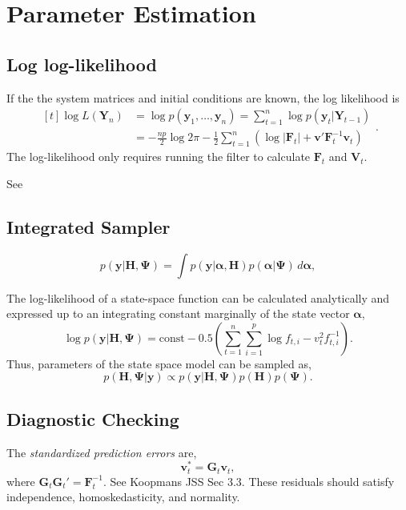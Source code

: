 \documentclass[]{book}
\newcommand{\mat}[1]{\boldsymbol{#1}}
\renewcommand{\vec}[1]{\boldsymbol{#1}}
\renewcommand{\T}{'}
\begin{document}
\chapter{Parameter Estimation}\label{parameter-estimation}

\section{Log log-likelihood}\label{log-log-likelihood}

If the the system matrices and initial conditions are known, the log
likelihood is \[
\begin{aligned}[t]
\log L(\mat{Y}_n) &= \log p(\vec{y}_1, \dots, \vec{y}_n) = \sum_{t = 1}^n \log p(\vec{y}_t | \mat{Y}_{t - 1}) \\
&= - \frac{np}{2} \log 2 \pi - \frac{1}{2} \sum_{t = 1}^n \left( \log \left| \mat{F}_t \right| + \vec{v}\T \mat{F}_t^{-1} \vec{v}_t \right)
\end{aligned} .
\] The log-likelihood only requires running the filter to calculate
\(\mat{F}_t\) and \(\mat{V}_t\).

See \autocite[Sec. 7.2.1]{DurbinKoopman2012}

\section{Integrated Sampler}\label{integrated-sampler}

\[
p(\vec{y} | \mat{H}, \mat{\Psi}) = \int p(\vec{y} | \vec{\alpha}, \mat{H}) p(\vec{\alpha} | \mat{\Psi})\,d\vec{\alpha},
\]

The log-likelihood of a state-space function can be calculated
analytically and expressed up to an integrating constant marginally of
the state vector \(\vec{\alpha}\), \[
\log p(\vec{y} | \mat{H}, \mat{\Psi}) = \text{const} - 0.5 \left( \sum_{t = 1}^n \sum_{i = 1}^p \log f_{t, i} - v_t^2 f^{-1}_{t,i} \right) .
\] Thus, parameters of the state space model can be sampled as, \[
p(\mat{H}, \mat{\Psi} | \vec{y}) \propto p(\vec{y} | \mat{H}, \mat{\Psi}) p(\mat{H}) p(\mat{\Psi}) .
\]

\section{Diagnostic Checking}\label{diagnostic-checking}

The \emph{standardized prediction errors} are, \[
\vec{v}^*_t = \mat{G}_t \vec{v}_t ,
\] where \(\mat{G}_t \mat{G}_t\T = \mat{F}_t^{-1}\). See Koopmans JSS
Sec 3.3. These residuals should satisfy independence, homoskedasticity,
and normality.
\end{document}
